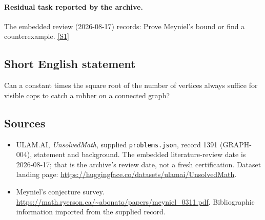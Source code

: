 \documentclass[11pt,a4paper]{article}
\newcommand{\sref}[2]{\hyperlink{source:#1:#2}{[S#2]}}
\begin{document}
\paragraph{Residual task reported by the archive.}

The embedded review (2026-08-17) records: Prove Meyniel's bound or find a counterexample. \sref{1391}{1}

\subsection{Short English statement}

Can a constant times the square root of the number of vertices always suffice for visible cops to catch a robber on a connected graph?

\subsection{Sources}

{\small

\begin{itemize}

\item[\hypertarget{source:1391:1}{S1}] ULAM.AI, \emph{UnsolvedMath}, supplied \texttt{problems.json}, record 1391 (GRAPH-004), statement and background. The embedded literature-review date is 2026-08-17; that is the archive’s review date, not a fresh certification. Dataset landing page: \url{https://huggingface.co/datasets/ulamai/UnsolvedMath}.

\item[\hypertarget{source:1391:2}{S2}] Meyniel's conjecture survey. \url{https://math.ryerson.ca/~abonato/papers/meyniel_0311.pdf}. Bibliographic information imported from the supplied record.

\end{itemize}

}

\label{end:1391}
\end{document}

